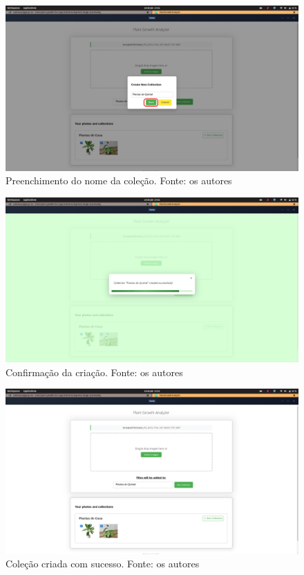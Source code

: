 \begin{figure}[H]
    \centering
    \includegraphics[width=1\textwidth]{../figures/screens/uc007/Screenshot from 2025-06-28 17-02-56.png}
    \caption{Preenchimento do nome da coleção. Fonte: os autores}
    \label{fig:uc007-screen3}
\end{figure}

\begin{figure}[H]
    \centering
    \includegraphics[width=1\textwidth]{../figures/screens/uc007/Screenshot from 2025-06-28 17-03-00.png}
    \caption{Confirmação da criação. Fonte: os autores}
    \label{fig:uc007-screen4}
\end{figure}

\begin{figure}[H]
    \centering
    \includegraphics[width=1\textwidth]{../figures/screens/uc007/Screenshot from 2025-06-28 17-03-57.png}
    \caption{Coleção criada com sucesso. Fonte: os autores}
    \label{fig:uc007-screen5}
\end{figure}

